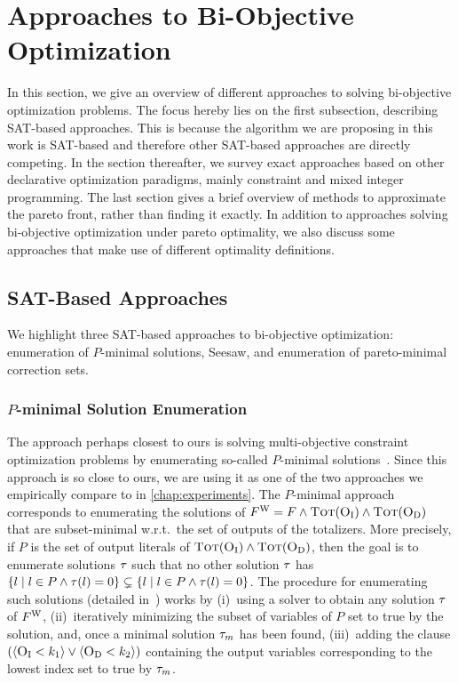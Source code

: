 \section{Approaches to Bi-Objective Optimization\label{sec:approaches}}

In this section, we give an overview of different approaches to solving bi-objective optimization problems.
The focus hereby lies on the first subsection, describing SAT-based approaches.
This is because the algorithm we are proposing in this work is SAT-based and therefore other SAT-based approaches are directly competing.
In the section thereafter, we survey exact approaches based on other declarative optimization paradigms, mainly constraint and mixed integer programming.
The last section gives a brief overview of methods to approximate the pareto front, rather than finding it exactly.
In addition to approaches solving bi-objective optimization under pareto optimality, we also discuss some approaches that make use of different optimality definitions.

\subsection{SAT-Based Approaches\label{sec:sat-based}}

We highlight three SAT-based approaches to bi-objective optimization:
enumeration of $P$-minimal solutions, Seesaw, and enumeration of pareto-minimal correction sets.

\subsubsection{$P$-minimal Solution Enumeration\label{sec:p-minimal}}

The approach perhaps closest to ours is solving multi-objective constraint optimization problems by enumerating so-called $P$-minimal solutions~\autocite{DBLP:conf/cp/SohBTB17,DBLP:conf/ftp/KoshimuraNFH09}.
Since this approach is so close to ours, we are using it as one of the two approaches we empirically compare \algname{} to in \cref{chap:experiments}.
The $P$-minimal approach  corresponds to enumerating the solutions of $F^\text{W} = F \land \textsc{Tot}(\textsc{O}_{\text{I}}) \land \textsc{Tot}(\textsc{O}_{\text{D}})$ that are subset-minimal w.r.t.\ the set of outputs of the totalizers.
More precisely, if $P$ is the set of output literals of $\textsc{Tot}(\textsc{O}_{\text{I}}) \land \textsc{Tot}(\textsc{O}_{\text{D}})$, then the goal is to enumerate solutions $\tau$ such that no other solution $\tau$ has $\{ l \mid l \in P \land \tau(l) = 0\} \subsetneq \{ l \mid l \in P \land \tau(l) = 0\}$.
The procedure for enumerating such solutions (detailed in~\textcite{DBLP:conf/ftp/KoshimuraNFH09}) works by (i)~using a solver to obtain any solution $\tau$ of $F^\text{W}$, (ii)~iteratively minimizing the subset of variables of $P$ set to true by the solution, and, once a minimal solution $\tau_m$ has been found, (iii)~adding the clause $(\langle \textsc{O}_{\text{I}} < k_1 \rangle \lor \langle \textsc{O}_{\text{D}} < k_2 \rangle)$ containing the output variables corresponding to the lowest index set to true by $\tau_m$.

